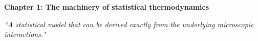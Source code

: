 \renewcommand{\theequation}{1.\arabic{equation}}

\begin{frame}
\begin{center}
{\bf Chapter 1: The machinery of statistical thermodynamics}\\
\end{center}

\scriptsize

\vspace*{3cm}

\begin{center}
\textit{``A statistical model that can be derived exactly from the underlying microscopic interactions."}
\end{center}

\end{frame}

\scriptsize









